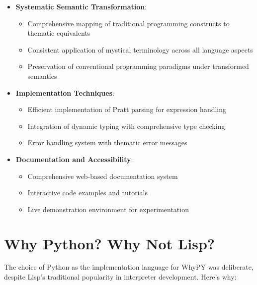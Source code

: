 \documentclass[conference]{IEEEtran}
\begin{document}
\begin{itemize}
    \item \textbf{Systematic Semantic Transformation}: 
    \begin{itemize}
        \item Comprehensive mapping of traditional programming constructs to thematic equivalents
        \item Consistent application of mystical terminology across all language aspects
        \item Preservation of conventional programming paradigms under transformed semantics
    \end{itemize}
    
    \item \textbf{Implementation Techniques}:
    \begin{itemize}
        \item Efficient implementation of Pratt parsing for expression handling
        \item Integration of dynamic typing with comprehensive type checking
        \item Error handling system with thematic error messages
    \end{itemize}
    
    \item \textbf{Documentation and Accessibility}:
    \begin{itemize}
        \item Comprehensive web-based documentation system
        \item Interactive code examples and tutorials
        \item Live demonstration environment for experimentation
    \end{itemize}
\end{itemize}


\section{Why Python? Why Not Lisp?}
The choice of Python as the implementation language for WhyPY was deliberate, despite Lisp's traditional popularity in interpreter development. Here's why:
\end{document}
